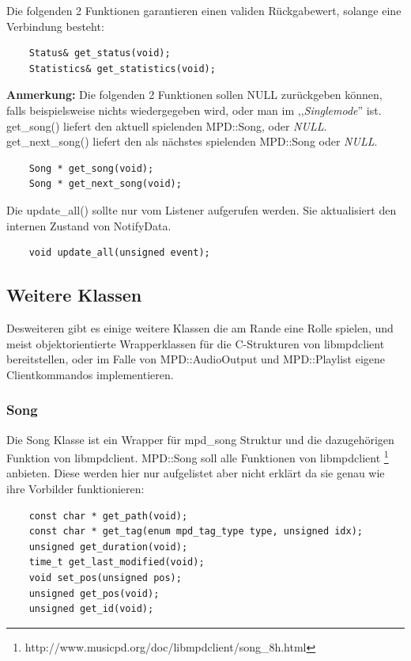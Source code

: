 Die folgenden 2 Funktionen garantieren einen validen Rückgabewert, solange eine Verbindung besteht:
\begin{verbatim}
    Status& get_status(void);
    Statistics& get_statistics(void);
\end{verbatim}

\textbf{Anmerkung:} Die folgenden 2 Funktionen sollen NULL zurückgeben können, falls beispielsweise
nichts wiedergegeben wird, oder man im ,,\textit{Singlemode}'' ist.
get\_song() liefert den aktuell spielenden MPD::Song, oder \emph{NULL}.
get\_next\_song() liefert den als nächstes spielenden MPD::Song oder \emph{NULL}.
\begin{verbatim} 
    Song * get_song(void);
    Song * get_next_song(void);
\end{verbatim}

Die update\_all() sollte nur vom Listener aufgerufen werden. Sie aktualisiert den internen Zustand
von NotifyData.
\begin{verbatim}
    void update_all(unsigned event);
\end{verbatim}


\subsection{Weitere Klassen}
Desweiteren gibt es einige weitere Klassen die am Rande eine Rolle spielen,
und meist objektorientierte Wrapperklassen für die C-Strukturen von libmpdclient bereitstellen,
oder im Falle von MPD::AudioOutput und MPD::Playlist eigene Clientkommandos implementieren.

\subsubsection{Song}

Die Song Klasse ist ein Wrapper für mpd\_song Struktur und die dazugehörigen Funktion von libmpdclient. 
MPD::Song soll alle Funktionen von libmpdclient \footnote{http://www.musicpd.org/doc/libmpdclient/song\_8h.html} anbieten.
Diese werden hier nur aufgelistet aber nicht erklärt da sie genau wie ihre Vorbilder funktionieren:

\begin{verbatim}
    const char * get_path(void);
    const char * get_tag(enum mpd_tag_type type, unsigned idx);
    unsigned get_duration(void);
    time_t get_last_modified(void);
    void set_pos(unsigned pos);
    unsigned get_pos(void);
    unsigned get_id(void);
\end{verbatim}

